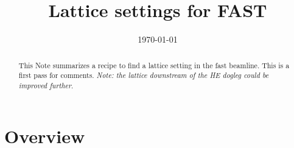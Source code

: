 \documentclass[notitlepage,twocolumn,nofootinbib,showpacs,preprintnumbers,superscriptaddress,amsmath,amssymb]{revtex4-1}
\begin{document}
\title{Lattice settings for FAST}
\date{\today}
	
\begin{abstract}
This Note summarizes a recipe to find a lattice setting in the {\sc fast} beamline. This is a first pass for comments. {\em Note: the lattice downstream of the HE dogleg could be improved further}.  
\end{abstract}
\maketitle
%
\section{Overview}
\end{document}
